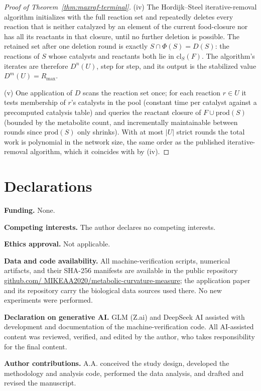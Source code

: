 \documentclass[11pt,a4paper]{article}
\theoremstyle{plain}
\theoremstyle{definition}
\theoremstyle{remark}
\begin{document}
\begin{proof}[Proof of Theorem~\ref{thm:maxraf-terminal}]
(iv) The Hordijk--Steel iterative-removal algorithm initializes
with the full reaction set and repeatedly deletes every reaction
that is neither catalyzed by an element of the current food-closure
nor has all its reactants in that closure, until no further
deletion is possible. The retained set after one deletion round is
exactly $S\cap\Phi(S)=D(S)$: the reactions of $S$ whose catalysts
and reactants both lie in $\mathrm{cl}_{S}(F)$. The algorithm's iterates are therefore
$D^{n}(U)$, step for step, and its output is the stabilized
value $D^{m}(U)=R_{\max}$.

(v) One application of $D$ scans the reaction set once; for each
reaction $r\in U$ it tests membership of $r$'s catalysts in the
pool (constant time per catalyst against a precomputed catalysis
table) and queries the reactant closure of
$F\cup\mathrm{prod}(S)$ (bounded by the metabolite count, and
incrementally maintainable between rounds since
$\mathrm{prod}(S)$ only shrinks). With at most $|U|$ strict
rounds the total work is polynomial in the network size, the same
order as the published iterative-removal algorithm, which it
coincides with by (iv).
\end{proof}

\section*{Declarations}
\noindent\textbf{Funding.} None.

\smallskip
\noindent\textbf{Competing interests.} The author declares no
competing interests.

\smallskip
\noindent\textbf{Ethics approval.} Not applicable.

\smallskip
\noindent\textbf{Data and code availability.} All
machine-verification scripts, numerical artifacts, and their SHA-256
manifests are available in the public repository
\href{https://github.com/MIKEAA2020/metabolic-curvature-measure}{github.com/
MIKEAA2020/metabolic-curvature-measure}; the application paper
\citep{zai2026measure} and its repository carry the biological data
sources used there. No new experiments were performed.

\smallskip
\noindent\textbf{Declaration on generative AI.} GLM (Z.ai) and
DeepSeek AI assisted with development and documentation of the
machine-verification code. All AI-assisted content was reviewed,
verified, and edited by the author, who takes responsibility for the
final content.

\smallskip
\noindent\textbf{Author contributions.} A.A. conceived the study
design, developed the methodology and analysis code, performed the
data analysis, and drafted and revised the manuscript.



\end{document}
